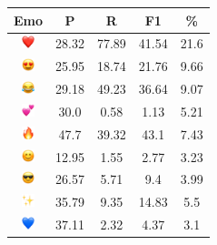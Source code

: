 \documentclass{article}
\begin{document}
\begin{table}
\centering
\begin{tabular}{|c|ccc|c|} \hline
\textbf{Emo} & \textbf{P} & \textbf{R} & \textbf{F1} & \textbf{\%} \\ \hline
\includegraphics[height=0.37cm,width=0.37cm]{img/red_heart.png} & 28.32 & 77.89 & 41.54 & 21.6\\ 
\includegraphics[height=0.37cm,width=0.37cm]{img/smiling_face_with_hearteyes.png} & 25.95 & 18.74 & 21.76 & 9.66\\ 
\includegraphics[height=0.37cm,width=0.37cm]{img/face_with_tears_of_joy.png} & 29.18 & 49.23 & 36.64 & 9.07\\ 
\includegraphics[height=0.37cm,width=0.37cm]{img/two_hearts.png} & 30.0 & 0.58 & 1.13 & 5.21\\ 
\includegraphics[height=0.37cm,width=0.37cm]{img/fire.png} & 47.7 & 39.32 & 43.1 & 7.43\\ 
\includegraphics[height=0.37cm,width=0.37cm]{img/smiling_face_with_smiling_eyes.png} & 12.95 & 1.55 & 2.77 & 3.23\\ 
\includegraphics[height=0.37cm,width=0.37cm]{img/smiling_face_with_sunglasses.png} & 26.57 & 5.71 & 9.4 & 3.99\\ 
\includegraphics[height=0.37cm,width=0.37cm]{img/sparkles.png} & 35.79 & 9.35 & 14.83 & 5.5\\ 
\includegraphics[height=0.37cm,width=0.37cm]{img/blue_heart.png} & 37.11 & 2.32 & 4.37 & 3.1\\ 

\end{tabular}
\end{table}
\end{document}
